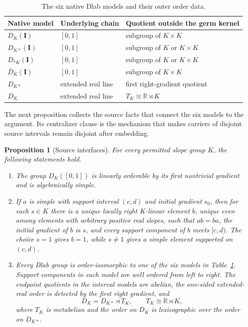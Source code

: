\documentclass[11pt]{amsart}
\newtheorem{proposition}[theorem]{Proposition}
\theoremstyle{definition}
\theoremstyle{remark}
\numberwithin{equation}{section}
\begin{document}
\begin{table}[t]
\centering
\small
\caption{The six native Dlab models and their outer order data.}
\label{tab:models}
\begin{tabular}{@{}p{}p{}p{}@{}}
\toprule
Native model & Underlying chain & Quotient outside the germ kernel \\
\midrule
\(D_K(\mathbf I)\) & \([0,1]\) & subgroup of \(K\times K\) \\
\(D_{K*}(\mathbf I)\) & \([0,1]\) & subgroup of \(K\) or \(K\times K\) \\
\(D_{*K}(\mathbf I)\) & \([0,1]\) & subgroup of \(K\) or \(K\times K\) \\
\(\bar D_K(\mathbf I)\) & \([0,1]\) & subgroup of \(K\times K\) \\
\(D_{K*}\) & extended real line & first right-gradient quotient \\
\(D_K\) & extended real line & \(T_K\cong\mathbb R\rtimes K\) \\
\bottomrule
\end{tabular}
\end{table}

The next proposition collects the source facts that connect the six models to the argument. Its centralizer clause is the mechanism that makes carriers of disjoint source intervals remain disjoint after embedding.

\begin{proposition}[Source interfaces]
\label{prop:source}
For every permitted slope group \(K\), the following statements hold.
\begin{enumerate}
\item The group \(D_K([0,1])\) is linearly orderable by its first nontrivial gradient and is algebraically simple.
\item If \(a\) is simple with support interval \((c,d)\) and initial gradient \(s_0\), then for each \(s\in K\) there is a unique locally right \(K\)-linear element \(b\), unique even among elements with arbitrary positive real slopes, such that \(ab=ba\), the initial gradient of \(b\) is \(s\), and every support component of \(b\) meets \([c,d)\). The choice \(s=1\) gives \(b=1\), while \(s\ne1\) gives a simple element supported on \((c,d)\).
\item Every Dlab group is order-isomorphic to one of the six models in Table~\ref{tab:models}. Support components in each model are well ordered from left to right. The endpoint quotients in the interval models are abelian, the one-sided extended-real order is detected by the first right gradient, and
\[
D_K=D_{K*}\rtimes T_K,
\qquad
T_K\cong\mathbb R\rtimes K,
\]
where \(T_K\) is metabelian and the order on \(D_K\) is lexicographic over the order on \(D_{K*}\).
\end{enumerate}
\end{proposition}
\end{document}
